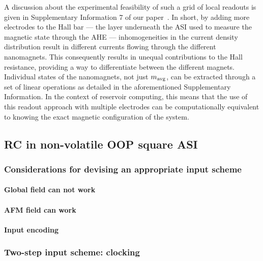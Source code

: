 A discussion about the experimental feasibility of such a grid of local readouts is given in Supplementary Information 7 of our paper~\cite{KUR-24}.
In short, by adding more electrodes to the Hall bar --- the layer underneath the ASI used to measure the magnetic state through the AHE --- inhomogeneities in the current density distribution result in different currents flowing through the different nanomagnets.
This consequently results in unequal contributions to the Hall resistance, providing a way to differentiate between the different magnets.
Individual states of the nanomagnets, not just $m_\mathrm{avg}$, can be extracted through a set of linear operations as detailed in the aforementioned Supplementary Information.
In the context of reservoir computing, this means that the use of this readout approach with multiple electrodes can be computationally equivalent to knowing the exact magnetic configuration of the system.



\subsection{RC in non-volatile OOP square ASI}
\subsubsection{Considerations for devising an appropriate input scheme}
\paragraph{Global field can not work} %
\paragraph{AFM field can work}
\paragraph{Input encoding} %
\subsubsection{Two-step input scheme: clocking} %

